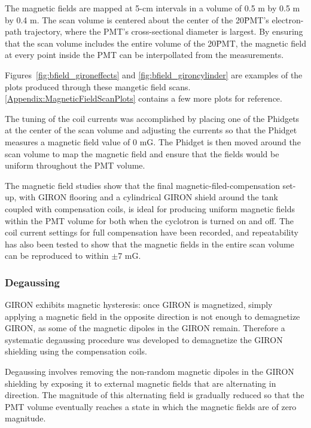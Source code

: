 The magnetic fields are mapped at 5-cm intervals in a volume of 0.5 m by 0.5 m by 0.4 m. The scan volume is centered about the center of the 20\" PMT's electron-path trajectory, where the PMT's cross-sectional diameter is largest. By ensuring that the scan volume includes the entire volume of the 20\" PMT, the magnetic field at every point inside the PMT can be interpollated from the measurements.

Figures~\ref{fig:bfield_gironeffects} and \ref{fig:bfield_gironcylinder} are examples of the plots produced through these mangetic field scans. \ref{Appendix:MagneticFieldScanPlots} contains a few more plots for reference.

The tuning of the coil currents was accomplished by placing one of the Phidgets at the center of the scan volume and adjusting the currents so that the Phidget measures a magnetic field value of 0 mG. The Phidget is then moved around the scan volume to map the magnetic field and ensure that the fields would be uniform throughout the PMT volume.

The magnetic field studies show that the final magnetic-filed-compensation set-up, with GIRON flooring and a cylindrical GIRON shield around the tank coupled with compensation coils, is ideal for producing uniform magnetic fields within the PMT volume for both when the cyclotron is turned on and off. The coil current settings for full compensation have been recorded, and repeatability has also been tested to show that the magnetic fields in the entire scan volume can be reproduced to within $\pm7$ mG.


\subsubsection{Degaussing}

GIRON exhibits magnetic hysteresis: once GIRON is magnetized, simply applying a magnetic field in the opposite direction is not enough to demagnetize GIRON, as some of the magnetic dipoles in the GIRON remain. Therefore a systematic degaussing procedure was developed to demagnetize the GIRON shielding using the compensation coils.

Degaussing involves removing the non-random magnetic dipoles in the GIRON shielding by exposing it to external magnetic fields that are alternating in direction. The magnitude of this alternating field is gradually reduced so that the PMT volume eventually reaches a state in which the magnetic fields are of zero magnitude.

